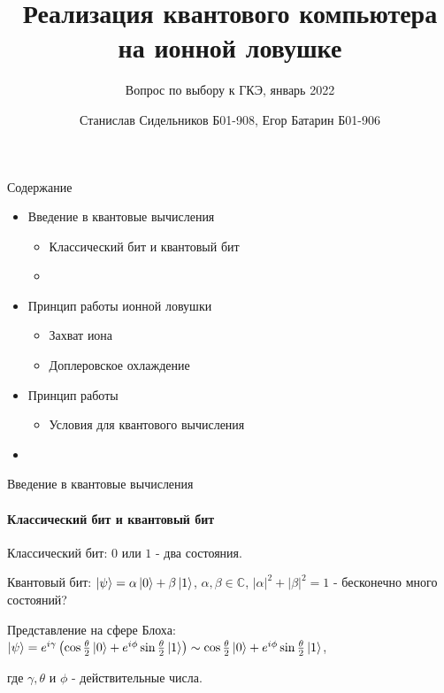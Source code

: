 \documentclass{beamer}
\title{Реализация квантового компьютера на ионной ловушке}
\subtitle{Вопрос по выбору к ГКЭ, январь 2022}
\author{Станислав Сидельников Б01-908, Егор Батарин Б01-906}
\institute{Московский физико-технический институт}
\date{}
\begin{document}
    
    \begin{frame}
        \titlepage
    \end{frame}

    \begin{frame}{Содержание}

        \begin{itemize}
            \item<1-> Введение в квантовые вычисления

                \begin{itemize}
                    \item Классический бит и квантовый бит
                    \item 

                \end{itemize}

            \item<2-> Принцип работы ионной ловушки

                \begin{itemize}
                    \item{Захват иона}
                    \item{Доплеровское охлаждение}
                \end{itemize}

            \item<3-> Принцип работы

                \begin{itemize}
                    \item{Условия для квантового вычисления}
                \end{itemize}

            \item
        \end{itemize}
    \end{frame}

	\begin{frame}{Введение в квантовые вычисления}
	\framesubtitle{Классический бит и квантовый бит}
	Классический бит: $0$ или $1$ - два состояния.
	\vspace{3mm}
	
	Квантовый бит: $\ket{\psi} = \alpha\ket{0} + \beta\ket{1}$, $\alpha,\beta \in \mathbb{C}$, $|\alpha|^2 + |\beta|^2 = 1$ - бесконечно много состояний?
	\vspace{3mm}
	
	Представление на сфере Блоха: $\ket{\psi} = e^{i\gamma}\left(  \cos{\frac{\theta}{2}}\ket{0}+e^{i\phi}\sin{\frac{\theta}{2}} \ket{1}  \right) \sim \cos{\frac{\theta}{2}}\ket{0}+e^{i\phi}\sin{\frac{\theta}{2}} \ket{1} $,
	
	где $\gamma, \theta$ и $\phi$ - действительные числа.
	\end{frame}
    
\end{document}
